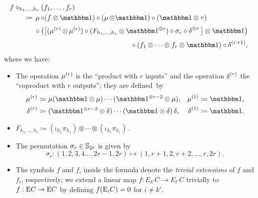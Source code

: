 \documentclass[\MainFolder/Text.tex]{subfiles}
\begin{document}
\begin{Definition}
\begin{equation} \label{Eq:CompositionFormula}
\begin{aligned}
&f\circ_{h_1, \dotsc, h_r}(f_1, \dotsc, f_r)\\
&\qquad \coloneqq \begin{multlined}[t]
\Prod\circ (f\otimes \Id)\circ(\Prod\otimes\Id)\circ(\Id\otimes \tau) \\[\jot] \circ \big(\big[(\Prod^{(r)}\otimes \Prod^{(r)})\circ (F_{h_1,\dotsc,h_r} \otimes \Id^{\otimes r})\circ \sigma_r\circ \CoProd^{\otimes r}\big] \otimes \Id \big) \\[\jot] \circ (f_1\otimes \dotsb \otimes f_r\otimes \Id)\circ\CoProd^{(r+1)},
\end{multlined}\end{aligned}
\end{equation}
where we have:
\begin{itemize}
\item The operation $\operatorname{\mu}^{(r)}$ is the ``product with $r$ inputs'' and the operation $\operatorname{\delta}^{(r)}$ the ``coproduct with $r$ outputs''; they are defined~by
$$ \begin{aligned}
\Prod^{(r)} &\coloneqq \Prod(\Id \otimes \Prod)\dotsb(\Id^{\otimes r-2} \otimes \Prod), & \Prod^{(1)}&\coloneqq \Id,\\
\CoProd^{(r)} &\coloneqq (\Id^{\otimes r-2} \otimes \CoProd)\dotsb(\Id \otimes \CoProd)\CoProd, &\CoProd^{(1)}&\coloneqq \Id.
\end{aligned} $$

\item $F_{h_1,\dotsc, h_r} \coloneqq (\iota_{h_1}\pi_{h_1}) \otimes \dotsb \otimes (\iota_{h_r}\pi_{h_r})$.%
\item The permutation $\sigma_r \in \mathbb{S}_{2r}$ is given by  
$$\sigma_r: (1,2,3,4\dotsc, 2r-1, 2r) \longmapsto (1,r+1,2,r+2, \dotsc, r, 2r).$$
\item The symbols $f$ and $f_i$ inside the formula denote the \emph{trivial extensions} of $f$ and $f_i$, respectively; we extend a linear map $f: E_{k'} C \rightarrow E_{l'} C$ trivially to $f: \mathrm{E} C \rightarrow \mathrm{E} C$ by defining $f(\mathrm{E}_i C)=0$ for $i\neq k'$.
\end{itemize}
\end{Definition}
\end{document}
